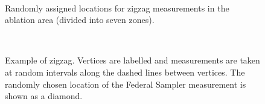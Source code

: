 \documentclass{sfuthesis}
\begin{document}
\begin{landscape}
\begin{figure}
	\centering
	\\
	\caption{Randomly assigned locations for zigzag measurements in the ablation area (divided into seven zones).}
	\label{zigzag_planned}
\end{figure}
\end{landscape}

\begin{figure}[H]
	\centering
	\\
	\caption{Example of zigzag. Vertices are labelled and measurements are taken at random intervals along the dashed lines between vertices. The randomly chosen location of the Federal Sampler measurement is shown as a diamond.}
	\label{zigzag_vertex}
\end{figure}
\end{document}
